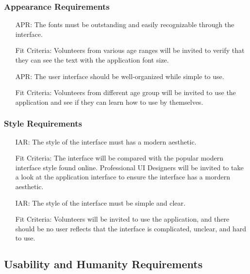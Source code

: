 \documentclass[12pt]{article}
\newcounter{reqnum} %
\newcounter{arreqnum} %
\newcounter{aprreqnum} %
\newcounter{iarreqnum} %
\begin{document}
\subsubsection{Appearance Requirements}
\begin{itemize}
    \item[APR\refstepcounter{aprreqnum}\theaprreqnum \label{R_Inputs}:] The fonts must be outstanding and easily recognizable through the interface.
    \item[] Fit Criteria: Volunteers from various age ranges will be invited to verify that they can see the text with the application font size.
    \item[APR\refstepcounter{aprreqnum}\theaprreqnum \label{R_Inputs}:] The user interface should be well-organized while simple to use. 
    \item[] Fit Criteria: Volunteers from different age group will be invited to use the application and see if they can learn how to use by themselves. 
\end{itemize}

\subsubsection{Style Requirements}
\begin{itemize}
    \item[IAR\refstepcounter{iarreqnum}\theiarreqnum \label{R_Inputs}:] The style of the interface must has a modern aesthetic.
    \item[] Fit Criteria: The interface will be compared with the popular modern interface style found online. Professional UI Designers will be invited to take a look at the application interface to ensure the interface has a mordern aesthetic.
    \item[IAR\refstepcounter{iarreqnum}\theiarreqnum \label{R_Inputs}:] The style of the interface must be simple and clear. 
    \item[] Fit Criteria: Volunteers will be invited to use the application, and there should be no user reflects that the interface is complicated, unclear, and hard to use.
\end{itemize}
\subsection{Usability and Humanity Requirements}
\end{document}
